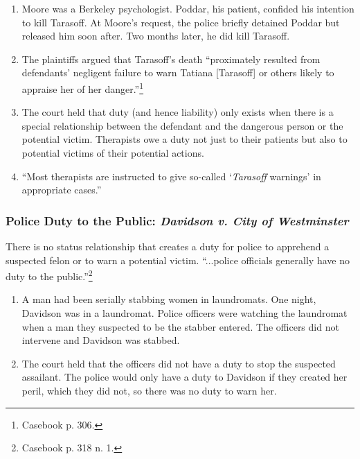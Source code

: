 \begin{enumerate}
    \item Moore was a Berkeley psychologist. Poddar, his patient, confided his 
    intention to kill Tarasoff. At Moore's request, the police briefly 
    detained Poddar but released him soon after. Two months later, he did kill 
    Tarasoff.
    \item The plaintiffs argued that Tarasoff's death ``proximately resulted 
    from defendants' negligent failure to warn Tatiana [Tarasoff] or others 
    likely to appraise her of her danger.''\footnote{Casebook p. 306.}
    \item The court held that duty (and hence liability) only exists when 
    there is a special relationship between the defendant and the dangerous 
    person or the potential victim. Therapists owe a duty not just to their 
    patients but also to potential victims of their potential actions.
    \item ``Most therapists are instructed to give so-called `\emph{Tarasoff} 
    warnings' in appropriate cases.''
\end{enumerate}

\subsubsection{Police Duty to the Public: \emph{Davidson v. City of Westminster}}

There is no status relationship that creates a duty for police to apprehend a 
suspected felon or to warn a potential victim. ``...police officials generally 
have no duty to the public.''\footnote{Casebook p. 318 n. 1.}

\begin{enumerate}
    \item A man had been serially stabbing women in laundromats. One night, 
    Davidson was in a laundromat. Police officers were watching the laundromat 
    when a man they suspected to be the stabber entered. The officers did not 
    intervene and Davidson was stabbed.
    \item The court held that the officers did not have a duty to stop the 
    suspected assailant. The police would only have a duty to Davidson if they 
    created her peril, which they did not, so there was no duty to warn her.
\end{enumerate}
